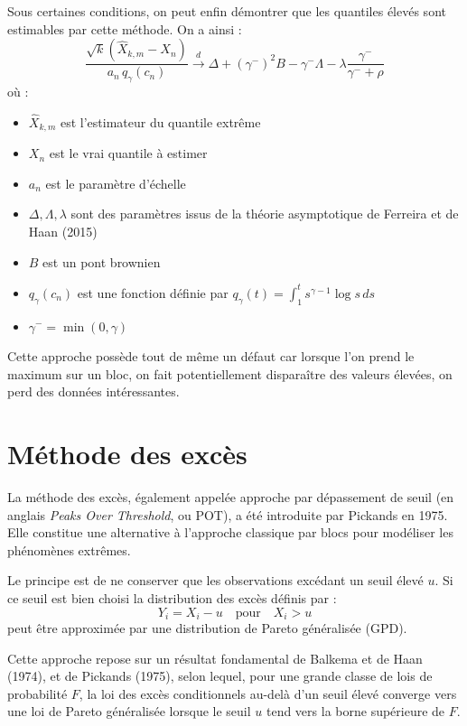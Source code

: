 \documentclass{article}
\theoremstyle{plain}
\theoremstyle{definition}
\theoremstyle{plain}
\begin{document}
\noindent Sous certaines conditions, on peut enfin démontrer que les quantiles élevés sont estimables par cette méthode. On a ainsi :
\[
\frac{\sqrt{k} \left( \hat{X}_{k,m} - X_n \right)}{a_n \, q_{\gamma}(c_n)}
\xrightarrow{d}
\Delta + (\gamma^-)^2 B - \gamma^- \Lambda - \lambda \frac{\gamma^-}{\gamma^- + \rho}
\]
où : \begin{itemize}
	\item $\hat{X}_{k,m}$ est l’estimateur du quantile extrême
	\item $X_n$ est le vrai quantile à estimer
	\item $a_n$ est le paramètre d'échelle
	\item $\Delta, \Lambda, \lambda$ sont des paramètres issus de la théorie asymptotique de Ferreira et de Haan (2015)
	\item $B$ est un pont brownien
	\item $q_{\gamma}(c_n)$ est une fonction définie par $q_{\gamma}(t) = \int_1^t s^{\gamma - 1} \log s \, ds$
	\item $\gamma^- = \min(0, \gamma)$
\end{itemize}
\vspace{0.5cm}
\noindent Cette approche possède tout de même un défaut car lorsque l'on prend le maximum sur un bloc, on fait potentiellement disparaître des valeurs élevées, on perd des données intéressantes.

\section{Méthode des excès}

La méthode des excès, également appelée approche par dépassement de seuil (en anglais \textit{Peaks Over Threshold}, ou POT), a été introduite par Pickands en 1975. Elle constitue une alternative à l’approche classique par blocs pour modéliser les phénomènes extrêmes.

Le principe est de ne conserver que les observations excédant un seuil élevé \( u \). Si ce seuil est bien choisi la distribution des excès définis par :
\[
Y_i = X_i - u \quad \text{pour} \quad X_i > u
\]
peut être approximée par une distribution de Pareto généralisée (GPD).

\medskip
Cette approche repose sur un résultat fondamental de Balkema et de Haan (1974), et de Pickands (1975), selon lequel, pour une grande classe de lois de probabilité \(F\), la loi des excès conditionnels au-delà d’un seuil élevé converge vers une loi de Pareto généralisée lorsque le seuil \(u\) tend vers la borne supérieure de \(F\).
\end{document}
